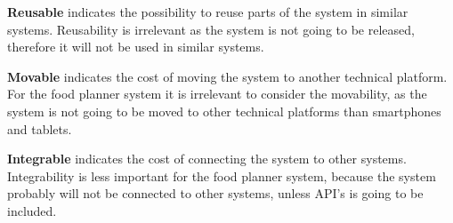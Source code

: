 \textbf{Reusable} indicates the possibility to reuse parts of the system in similar systems. Reusability is irrelevant as the system is not going to be released, therefore it will not be used in similar systems.

\textbf{Movable} indicates the cost of moving the system to another technical platform. For the food planner system it is irrelevant to consider the movability, as the system is not going to be moved to other technical platforms than smartphones and tablets.

\textbf{Integrable} indicates the cost of connecting the system to other systems. Integrability is less important for the food planner system, because the system probably will not be connected to other systems, unless API's is going to be included.
